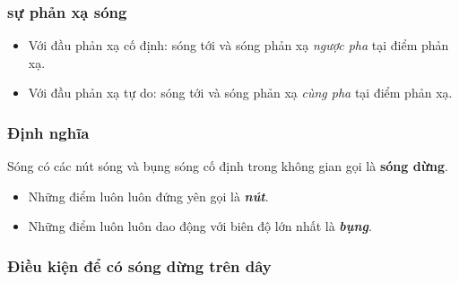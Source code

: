 \subsubsection{sự phản xạ sóng}
\begin{itemize}
\item Với đầu phản xạ cố định: sóng tới và sóng phản xạ \textit{ngược pha} tại điểm phản xạ.
\item Với đầu phản xạ tự do: sóng tới và sóng phản xạ \textit{cùng pha} tại điểm phản xạ.
\end{itemize}
\subsubsection{Định nghĩa}
Sóng có các nút sóng và bụng sóng cố định trong không gian gọi là \textbf{sóng dừng}.
\begin{itemize}
\item Những điểm luôn luôn đứng yên gọi là \textbf{\textit{nút}}.
\item Những điểm luôn luôn dao động với biên độ lớn nhất là \textbf{\textit{bụng}}.
\end{itemize}
\subsubsection{Điều kiện để có sóng dừng trên dây}
